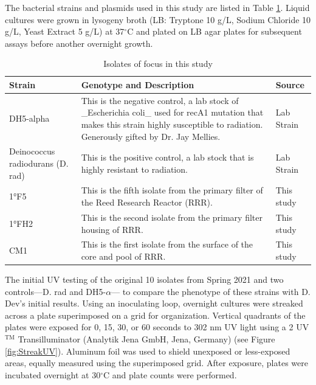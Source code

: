 \documentclass[12pt,twoside]{reedthesis}
\begin{document}
The bacterial strains and plasmids used in this study are listed in Table \ref{tab:isolates}. Liquid cultures were grown in lysogeny broth (LB: Tryptone 10 g/L, Sodium Chloride 10 g/L, Yeast Extract 5 g/L) at 37\(^{\circ}\)C and plated on LB agar plates for subsequent assays before another overnight growth.
\begin{longtable}[t]{lll}
\caption[Isolates of Focus]{\label{tab:isolates}Isolates of focus in this study}\\
\toprule
Strain & Genotype and Description & Source\\
\midrule
DH5-alpha & This is the negative control, a lab stock of \_Escherichia coli\_ used for recA1 mutation that makes this strain highly susceptible to radiation. Generously gifted by Dr. Jay Mellies. & Lab Strain\\
Deinococcus radiodurans (D. rad) & This is the positive control, a lab stock that is highly resistant to radiation. & Lab Strain\\
1°F5 & This is the fifth isolate from the primary filter of the Reed Research Reactor (RRR). & This study\\
1°FH2 & This is the second isolate from the primary filter housing of RRR. & This study\\
CM1 & This is the first isolate from the surface of the core and pool of RRR. & This study\\
\bottomrule
\end{longtable}
The initial UV testing of the original 10 isolates from Spring 2021 and two controls---D. rad and DH5-\(\alpha\)--- to compare the phenotype of these strains with D. Dev's initial results. Using an inoculating loop, overnight cultures were streaked across a plate superimposed on a grid for organization. Vertical quadrants of the plates were exposed for 0, 15, 30, or 60 seconds to 302 nm UV light using a 2 UV\(^{\text{TM}}\) Transilluminator (Analytik Jena GmbH, Jena, Germany) (see Figure \ref{fig:StreakUV}). Aluminum foil was used to shield unexposed or less-exposed areas, equally measured using the superimposed grid. After exposure, plates were incubated overnight at 30\(^{\circ}\)C and plate counts were performed.
\end{document}
